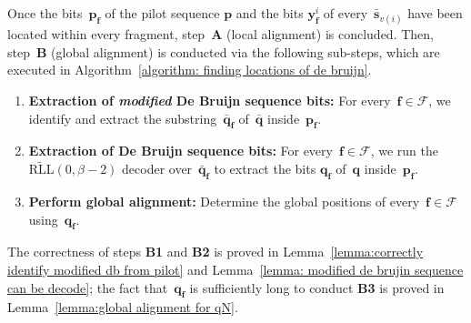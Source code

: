 \documentclass[journal,letterpaper,onecolumn,11pt]{IEEEtran}
\newcommand{\cC}{\mathcal{C}}
\newcommand{\cF}{\mathcal{F}}
\newcommand{\boldf}{\mathbf{f}}
\newcommand{\boldp}{\mathbf{p}}
\newcommand{\boldq}{\mathbf{q}}
\newcommand{\bolds}{\mathbf{s}}
\begin{document}
Once the bits~$\boldp_{\boldf}$ of the pilot sequence $\boldp$ and the bits $\mathbf{y}_\boldf^i$ of every~$\bar{\bolds}_{v(i)}$ have been located within every fragment, step~\textbf{A} (local alignment) is concluded. 
Then, step~\textbf{B} (global alignment) is conducted via the following sub-steps, which are executed in Algorithm~\ref{algorithm: finding locations of de bruijn}.
\begin{enumerate}
    \item[\textbf{B1}] \textbf{Extraction of \textit{modified} De Bruijn sequence bits:} For every~$\boldf\in \cF$, we identify and extract the substring~$\bar{\boldq}_{\boldf}$ of~$\bar{\boldq}$ inside~$\boldp_{\boldf}$.
    \item[\textbf{B2}] \textbf{Extraction of De Bruijn sequence bits:} For every~$\boldf\in \cF$, we run the $\widetilde{\mathrm{RLL}}(0,\beta-2)$ decoder over~$\bar{\boldq}_{\boldf}$ to extract the bits $\mathbf{q}_{\boldf}$ of~$\boldq$ inside~$\boldp_{\boldf}$.
    \item[\textbf{B3}] \textbf{Perform global alignment:} Determine the global positions of every~$\boldf\in \cF$ using~$\boldq_{\boldf}$.
    
\end{enumerate}

The correctness of steps \textbf{B1} and \textbf{B2} is proved in Lemma~\ref{lemma:correctly identify modified db from pilot} and Lemma~\ref{lemma: modified de brujin sequence can be decode}; the fact that~$\boldq_{\boldf}$ is sufficiently long to conduct \textbf{B3} is proved in Lemma~\ref{lemma:global alignment for qN}.
\end{document}

